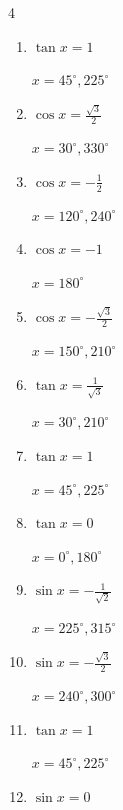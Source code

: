\begin{multicols}{4}
\begin{enumerate}
\columnbreak %

  \item $\displaystyle \tan{x}  = 1$

        $\displaystyle x = 45^{\circ} , 225^{\circ}$

  \item $\displaystyle \cos{x}  = \frac{\sqrt{3}}{2}$

        $\displaystyle x = 30^{\circ} , 330^{\circ}$

  \item $\displaystyle \cos{x}  = -\frac{1}{2}$

        $\displaystyle x = 120^{\circ} , 240^{\circ}$

  \item $\displaystyle \cos{x}  = -1$

        $\displaystyle x = 180^{\circ}$

  \item $\displaystyle \cos{x}  = -\frac{\sqrt{3}}{2}$

        $\displaystyle x = 150^{\circ} , 210^{\circ}$

  \item $\displaystyle \tan{x}  = \frac{1}{\sqrt{3}}$

        $\displaystyle x = 30^{\circ} , 210^{\circ}$

  \item $\displaystyle \tan{x}  = 1$

        $\displaystyle x = 45^{\circ} , 225^{\circ}$

  \item $\displaystyle \tan{x}  = 0$

        $\displaystyle x = 0^{\circ} , 180^{\circ}$

  \item $\displaystyle \sin{x}  = -\frac{1}{\sqrt{2}}$

        $\displaystyle x = 225^{\circ} , 315^{\circ}$

  \item $\displaystyle \sin{x}  = -\frac{\sqrt{3}}{2}$

        $\displaystyle x = 240^{\circ} , 300^{\circ}$

  \item $\displaystyle \tan{x}  = 1$

        $\displaystyle x = 45^{\circ} , 225^{\circ}$

  \item $\displaystyle \sin{x}  = 0$


\end{enumerate}
\end{multicols}
